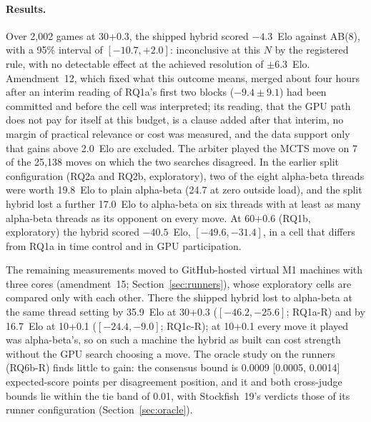 \documentclass{article}
\begin{document}
\paragraph{Results.} Over 2{,}002 games at 30+0.3, the shipped hybrid scored $-4.3$~Elo against AB(8), with a 95\% interval of $[-10.7, +2.0]$: inconclusive at this $N$ by the registered rule, with no detectable effect at the achieved resolution of $\pm 6.3$~Elo. Amendment~12, which fixed what this outcome means, merged about four hours after an interim reading of RQ1a's first two blocks ($-9.4 \pm 9.1$) had been committed and before the cell was interpreted; its reading, that the GPU path does not pay for itself at this budget, is a clause added after that interim, no margin of practical relevance or cost was measured, and the data support only that gains above 2.0~Elo are excluded. The arbiter played the MCTS move on 7 of the 25{,}138 moves on which the two searches disagreed. In the earlier split configuration (RQ2a and RQ2b, exploratory), two of the eight alpha-beta threads were worth 19.8~Elo to plain alpha-beta (24.7 at zero outside load), and the split hybrid lost a further 17.0~Elo to alpha-beta on six threads with at least as many alpha-beta threads as its opponent on every move. At 60+0.6 (RQ1b, exploratory) the hybrid scored $-40.5$~Elo, $[-49.6, -31.4]$, in a cell that differs from RQ1a in time control and in GPU participation.

The remaining measurements moved to GitHub-hosted virtual M1 machines with three cores (amendment~15; Section~\ref{sec:runners}), whose exploratory cells are compared only with each other. There the shipped hybrid lost to alpha-beta at the same thread setting by 35.9~Elo at 30+0.3 ($[-46.2, -25.6]$; RQ1a-R) and by 16.7~Elo at 10+0.1 ($[-24.4, -9.0]$; RQ1c-R); at 10+0.1 every move it played was alpha-beta's, so on such a machine the hybrid as built can cost strength without the GPU search choosing a move. The oracle study on the runners (RQ6b-R) finds little to gain: the consensus bound is 0.0009 [0.0005, 0.0014] expected-score points per disagreement position, and it and both cross-judge bounds lie within the tie band of 0.01, with Stockfish~19's verdicts those of its runner configuration (Section~\ref{sec:oracle}).
\end{document}
